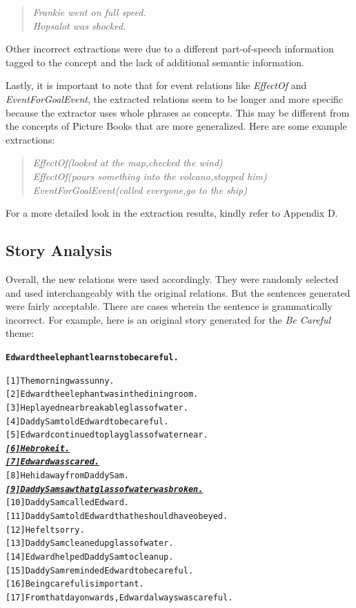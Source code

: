 \begin{verse}
\itshape
Frankie went on full speed.\\
Hopsalot was shocked.
\end{verse}

Other incorrect extractions were due to a different part-of-speech information tagged to the concept and the lack of additional semantic information.

Lastly, it is important to note that for event relations like \textit{EffectOf} and \textit{EventForGoalEvent}, the extracted relations seem to be longer and more specific because the extractor uses whole phrases as concepts. This may be different from the concepts of Picture Books that are more generalized. Here are some example extractions:

\begin{verse}
\itshape
EffectOf(looked at the map,checked the wind)\\
EffectOf(pours something into the volcano,stopped him)\\
EventForGoalEvent(called everyone,go to the ship)
\end{verse}

For a more detailed look in the extraction results, kindly refer to Appendix D.

\subsection{Story Analysis}
\label{sec:storyanalysis}

Overall, the new relations were used accordingly. They were randomly selected and used interchangeably with the original relations. But the sentences generated were fairly acceptable. There are cases wherein the sentence is grammatically incorrect. For example, here is an original story generated for the \textit{Be Careful} theme:

\begin{alltt}
\textbf{Edward the elephant learns to be careful.}

[1]  The morning was sunny.
[2]  Edward the elephant was in the dining room.
[3]  He played near breakable glass of water.
[4]  Daddy Sam told Edward to be careful.
[5]  Edward continued to play glass of water near.
\underline{\emph{\textbf{[6]  He broke it.}}}
\underline{\emph{\textbf{[7]  Edward was scared.}}}
[8]  He hid away from Daddy Sam.
\underline{\emph{\textbf{[9]  Daddy Sam saw that glass of water was broken.}}}
[10] Daddy Sam called Edward.
[11] Daddy Sam told Edward that he should have obeyed.
[12] He felt sorry.
[13] Daddy Sam cleaned up glass of water.
[14] Edward helped Daddy Sam to clean up.
[15] Daddy Sam reminded Edward to be careful.
[16] Being careful is important.
[17] From that day onwards, Edward always was careful.
\end{alltt}

